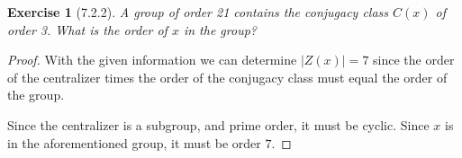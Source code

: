 \documentclass[12pt]{article}
\newtheorem*{exer}{Exercise}
\begin{document}

\begin{exer}[7.2.2]
    A group of order 21 contains the conjugacy class $C(x)$ of order 3.
    What is the order of $x$ in the group?
\end{exer}

\begin{proof}
    With the given information we can determine $|Z(x)|=7$ since the
    order of the centralizer times the order of the conjugacy class must
    equal the order of the group.

    Since the centralizer is a subgroup, and prime order, it must be
    cyclic. Since $x$ is in the aforementioned group, it must be order
    $7$.

\end{proof}
\end{document}
